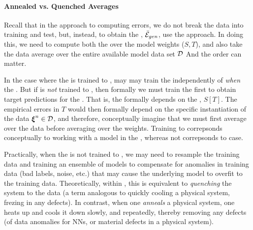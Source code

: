 
\paragraph{Annealed vs. Quenched Averages}
Recall that in the \STATMECH approach to computing errors, we do not break the data into
training and test, but, instead, to obtain the \AverageGeneralizationError, $\bar{\mathcal{E}}_{gen}$, use
the \GeneratingFunction approach. In doing this, we need to compute both the \ThermalAverage
over the model weights ($S,T$), and also take the data average over the entire available model data set $\mathcal{D}$
And the order can matter.

In the case where the \Teacher is trained to \Interpolation, may may train the \Student 
independently of \emph{when} the \Teacher.  
But if \Teacher is \emph{not} trained to \Interpolation, then formally we must train the \Teacher
first to obtain target predictions for the \Student.  That is, the \Student formally
depends on the \Teacher, $S[T]$.
The empirical errors in $T$ would then formally depend on the specific instantiation of the data  $\boldsymbol{\xi}^{n}\in\mathcal{D}$,
and therefore, conceptually imagine that we must first average over the data
before averaging over the weights.
Training to \Interpolation correpsonds conceptually to working with a model
in the \AnnealedApproximation, whereas not correpsonds to \Quenched case.

Practically, when the \Teacher is not trained to \Interpolation, 
we may need to resample the training data and training an ensemble of models to compensate for anomalies in training data (bad labels, noise, etc.) that may cause the underlying model to overfit to the training data.
Theoretically, within \SMOG, this is equivalent to \emph{quenching} the system to the data (a term analogous to quickly cooling a physical system, frezing in any defects).
In contrast, when one \emph{anneals} a physical system, one heats up and cools it down slowly, and repeatedly, thereby removing any defects (of data anomalies for NNs, or material defects in a physical system).

